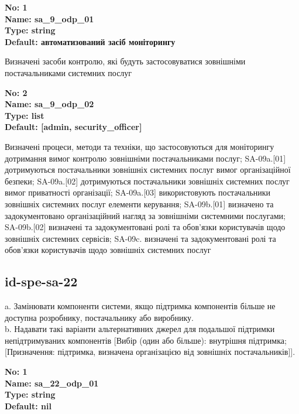 \documentclass{article}
\begin{document}
\vspace{10pt}
{\footnotesize\bfseries
No: 1\\
Name: sa\_\allowbreak{}9\_\allowbreak{}odp\_\allowbreak{}01\\
Type: string\\
Default: \textquotedbl{}автоматизований засіб моніторингу\textquotedbl{}
}

{\footnotesize Визначені засоби контролю, які будуть застосовуватися зовнішніми постачальниками системних послуг}


{\footnotesize\bfseries
No: 2\\
Name: sa\_\allowbreak{}9\_\allowbreak{}odp\_\allowbreak{}02\\
Type: list\\
Default: [\textquotedbl{}admin\textquotedbl{}, \textquotedbl{}security\_\allowbreak{}officer\textquotedbl{}]
}

{\footnotesize Визначені процеси, методи та техніки, що застосовуються для моніторингу дотримання вимог контролю зовнішніми постачальниками послуг; SA-09a.[01] дотримуються постачальники зовнішніх системних послуг вимог організаційної безпеки; SA-09a.[02] дотримуються постачальники зовнішніх системних послуг вимог приватності організації; SA-09a.[03] використовують постачальники зовнішніх системних послуг елементи керування; SA-09b.[01] визначено та задокументовано організаційний нагляд за зовнішніми системними послугами; SA-09b.[02] визначені та задокументовані ролі та обов'язки користувачів щодо зовнішніх системних сервісів; SA-09c. визначені та задокументовані ролі та обов'язки користувачів щодо зовнішніх системних послуг}




\subsection{id-spe-sa-22}
a. Замінювати компоненти системи, якщо підтримка компонентів більше не доступна розробнику, постачальнику або виробнику.\\ 
b. Надавати такі варіанти альтернативних джерел для подальшої підтримки непідтримуваних компонентів [Вибір (один або більше): внутрішня підтримка; [Призначення: підтримка, визначена організацією від зовнішніх постачальників]].

\vspace{10pt}
{\footnotesize\bfseries
No: 1\\
Name: sa\_\allowbreak{}22\_\allowbreak{}odp\_\allowbreak{}01\\
Type: string\\
Default: nil
}
\end{document}
